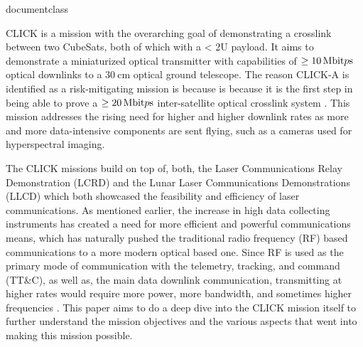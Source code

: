 \csname documentclass
\usepackage[utf8x]{inputenc}
\usepackage{blindtext}
\usepackage{float}
\usepackage{graphicx}
\usepackage{siunitx}
\usepackage{cite}
\usepackage{hyperref}
\usepackage{cleveref}



CLICK is a mission with the overarching goal of demonstrating a crosslink between two CubeSats, both of which with a < 2U payload. 
It aims to demonstrate a miniaturized optical transmitter with capabilities of \(\ge \qty[per-mode = symbol,per-symbol = p]{10}{\mega\bit\per\second}\) optical downlinks to a \(\qty{30}{\centi\meter}\) optical ground telescope. 
The reason CLICK-A is identified as a risk-mitigating mission is because is because it is the first step in being able to prove a \(\ge \qty[per-mode = symbol,per-symbol = p]{20}{\mega\bit\per\second}\) inter-satellite optical crosslink system \cite{cierny_testing_2020}.
This mission addresses the rising need for higher and higher downlink rates as more and more data-intensive components are sent flying, such as a cameras used for hyperspectral imaging.


The CLICK missions build on top of, both, the Laser Communications Relay Demonstration (LCRD) and the Lunar Laser Communications Demonstrations (LLCD) which both showcased the feasibility and efficiency of laser communications. 
As mentioned earlier, the increase in high data collecting instruments has created a need for more efficient and powerful communications means, which has naturally pushed the traditional radio frequency (RF) based communications to a more modern optical based one.
Since RF is used as the primary mode of communication with the telemetry, tracking, and command (TT\&C), as well as, the main data downlink communication, transmitting at higher rates would require more power, more bandwidth, and sometimes higher frequencies \cite{click_a}.
This paper aims to do a deep dive into the CLICK mission itself to further understand the mission objectives and the various aspects that went into making this mission possible.


